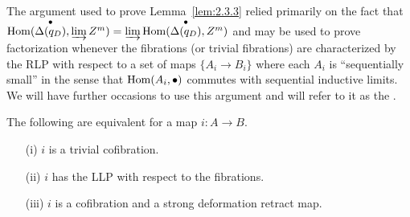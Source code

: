 \documentclass[../main]{subfiles}
\begin{document}
\begin{remark*}
The argument used to prove Lemma~\ref{lem:2.3.3} relied primarily on the fact that $\operatorname{Hom} (\overset{\bullet}{\Delta(q_D)}, \varinjlim Z^m) = \varinjlim \operatorname{Hom}(\overset{\bullet}{\Delta(q_D)}, Z^m)$ and may be used to prove factorization whenever the fibrations (or trivial fibrations) are characterized by the RLP with respect to a set of maps $\{A_i \to B_i\}$ where each $A_i$ is ``sequentially small'' in the sense that $\operatorname{Hom}(A_i, \bullet)$ commutes with sequential inductive limits. We will have further occasions to use this argument and will refer to it as the . 
\end{remark*} 

\begin{lemma}
\label{lem:2.3.4}
The following are equivalent for a map $i \colon A \to B$. 
\begin{enumerate}
    \item[(i)] $i$ is a trivial cofibration.
    \item[(ii)] $i$ has the LLP with respect to the fibrations.
    \item[(iii)] $i$ is a cofibration and a strong deformation retract map. 
\end{enumerate} 
\end{lemma} 
\end{document}

